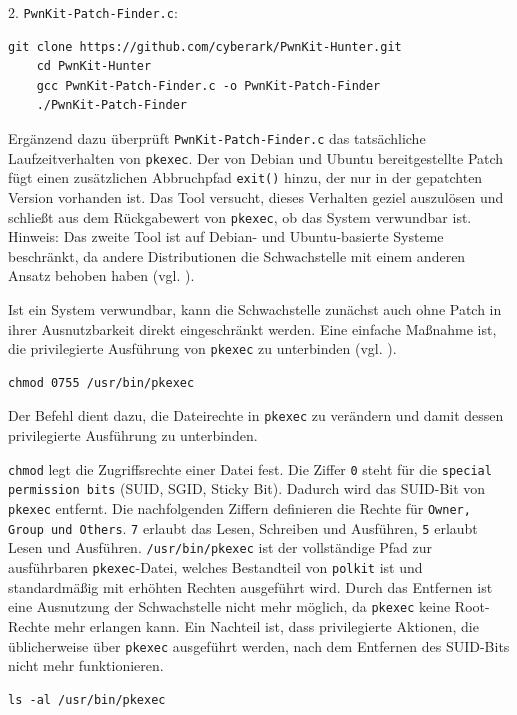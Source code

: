 \documentclass[oneside,11pt,a4paper,article,german]{memoir}
\begin{document}
\par
2. \texttt{PwnKit-Patch-Finder.c}:
\par
\begin{lstlisting}[caption={Laufzeitbasierte Verwundbarkeitsprüfung von \texttt{pkexec}}]
    git clone https://github.com/cyberark/PwnKit-Hunter.git
    cd PwnKit-Hunter
    gcc PwnKit-Patch-Finder.c -o PwnKit-Patch-Finder
    ./PwnKit-Patch-Finder
\end{lstlisting}

\par Ergänzend dazu überprüft \texttt{PwnKit-Patch-Finder.c} das tatsächliche Laufzeitverhalten von \texttt{pkexec}. Der von Debian und Ubuntu
bereitgestellte Patch fügt einen zusätzlichen Abbruchpfad \texttt{exit()} hinzu, der nur in der gepatchten Version vorhanden ist.
Das Tool versucht, dieses Verhalten geziel auszulösen und schließt aus dem Rückgabewert von \texttt{pkexec}, ob das System verwundbar ist.
Hinweis: Das zweite Tool ist auf Debian- und Ubuntu-basierte Systeme beschränkt, da andere Distributionen die
Schwachstelle mit einem anderen Ansatz behoben haben (vgl. \cite{c10_pwnkit_hunter, c11_git_pwnkit_hunter}).

\par
Ist ein System verwundbar, kann die Schwachstelle zunächst auch ohne Patch in ihrer Ausnutzbarkeit direkt eingeschränkt werden. Eine einfache
Maßnahme ist, die privilegierte Ausführung von \texttt{pkexec} zu unterbinden (vgl. \cite{c10_pwnkit_hunter, c12_verteidigung_chmod, c16_qualys}).
\par
\begin{lstlisting}[caption={Entfernen des SUID-Bits von \texttt{pkexec}}]
    chmod 0755 /usr/bin/pkexec
\end{lstlisting}

\par
Der Befehl dient dazu, die Dateirechte in \texttt{pkexec} zu verändern und damit dessen privilegierte Ausführung zu unterbinden.
\par
\texttt{chmod} legt die Zugriffsrechte einer Datei fest. Die Ziffer \texttt{0} steht für die \texttt{special permission bits}
(SUID, SGID, Sticky Bit). Dadurch wird das SUID-Bit von \texttt{pkexec} entfernt.
Die nachfolgenden Ziffern definieren die Rechte für \texttt{Owner, Group und Others}. \texttt{7} erlaubt das Lesen, Schreiben und Ausführen,
\texttt{5} erlaubt Lesen und Ausführen.
\texttt{/usr/bin/pkexec} ist der vollständige Pfad zur ausführbaren \texttt{pkexec}-Datei, welches Bestandteil von \texttt{polkit}
ist und standardmäßig mit erhöhten Rechten ausgeführt wird. Durch das Entfernen ist eine Ausnutzung der Schwachstelle nicht mehr möglich,
da \texttt{pkexec} keine Root-Rechte mehr erlangen kann.
Ein Nachteil ist, dass privilegierte Aktionen, die üblicherweise über \texttt{pkexec} ausgeführt werden,
nach dem Entfernen des SUID-Bits nicht mehr funktionieren.
\par
\begin{lstlisting}[caption={Zeigt, ob \texttt{pkexec} ein SUID-Root-binary ist}]
    ls -al /usr/bin/pkexec
\end{lstlisting}
\end{document}
